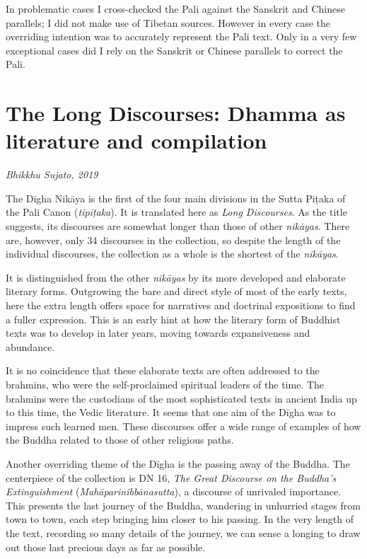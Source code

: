 \documentclass[12pt,openany]{book}%
\newcommand*{\scbyline}[1]{\begin{flushright}\textit{#1}\end{flushright}\bigskip}
\begin{document}
In problematic cases I cross-checked the Pali against the Sanskrit and Chinese parallels; I did not make use of Tibetan sources. However in every case the overriding intention was to accurately represent the Pali text. Only in a very few exceptional cases did I rely on the Sanskrit or Chinese parallels to correct the Pali.

%
\chapter*{The Long Discourses: Dhamma as literature and compilation}

\scbyline{Bhikkhu Sujato, 2019}

The \textsanskrit{Dīgha} \textsanskrit{Nikāya} is the first of the four main divisions in the Sutta \textsanskrit{Piṭaka} of the Pali Canon (\textit{\textsanskrit{tipiṭaka}}). It is translated here as \textit{Long Discourses}. As the title suggests, its discourses are somewhat longer than those of other \textit{\textsanskrit{nikāyas}}. There are, however, only 34 discourses in the collection, so despite the length of the individual discourses, the collection as a whole is the shortest of the \textit{\textsanskrit{nikāyas}}.

It is distinguished from the other \textit{\textsanskrit{nikāyas}} by its more developed and elaborate literary forms. Outgrowing the bare and direct style of most of the early texts, here the extra length offers space for narratives and doctrinal expositions to find a fuller expression. This is an early hint at how the literary form of Buddhist texts was to develop in later years, moving towards expansiveness and abundance.

It is no coincidence that these elaborate texts are often addressed to the brahmins, who were the self-proclaimed spiritual leaders of the time. The brahmins were the custodians of the most sophisticated texts in ancient India up to this time, the Vedic literature. It seems that one aim of the \textsanskrit{Dīgha} was to impress such learned men. These discourses offer a wide range of examples of how the Buddha related to those of other religious paths.

Another overriding theme of the \textsanskrit{Dīgha} is the passing away of the Buddha. The centerpiece of the collection is DN 16, \textit{The Great Discourse on the Buddha’s Extinguishment} (\textit{\textsanskrit{Mahāparinibbānasutta}}), a discourse of unrivaled importance. This presents the last journey of the Buddha, wandering in unhurried stages from town to town, each step bringing him closer to his passing. In the very length of the text, recording so many details of the journey, we can sense a longing to draw out those last precious days as far as possible.
\end{document}

